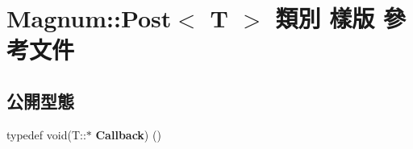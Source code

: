 \hypertarget{class_magnum_1_1_post}{}\section{Magnum\+:\+:Post$<$ T $>$ 類別 樣版 參考文件}
\label{class_magnum_1_1_post}
\subsection*{公開型態}
\begin{DoxyCompactItemize}
\item 
typedef void(T\+::$\ast$ {\bfseries Callback}) ()\hypertarget{class_magnum_1_1_post_a63cdd3a9060b6002ec0e990099699c34}{}\label{class_magnum_1_1_post_a63cdd3a9060b6002ec0e990099699c34}

\end{DoxyCompactItemize}
